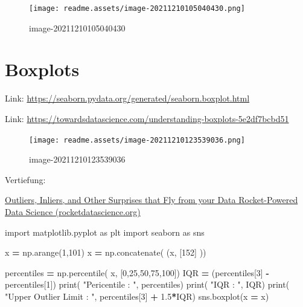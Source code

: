 \documentclass[
  oneside]{book}
\newenvironment{Shaded}{\begin{snugshade}}{\end{snugshade}}
\newcommand{\BuiltInTok}[1]{#1}
\newcommand{\DecValTok}[1]{\textcolor[rgb]{0.00,0.00,0.81}{#1}}
\newcommand{\FloatTok}[1]{\textcolor[rgb]{0.00,0.00,0.81}{#1}}
\newcommand{\ImportTok}[1]{#1}
\newcommand{\NormalTok}[1]{#1}
\newcommand{\OperatorTok}[1]{\textcolor[rgb]{0.81,0.36,0.00}{\textbf{#1}}}
\newcommand{\StringTok}[1]{\textcolor[rgb]{0.31,0.60,0.02}{#1}}
\begin{document}
\begin{figure}
\centering
\texttt{[image: readme.assets/image-20211210105040430.png]}
\caption{image-20211210105040430}
\end{figure}

\hypertarget{boxplots}{%
\section{Boxplots}\label{boxplots}}

Link: \url{https://seaborn.pydata.org/generated/seaborn.boxplot.html} 

Link: \url{https://towardsdatascience.com/understanding-boxplots-5e2df7bcbd51}

\begin{figure}
\centering
\texttt{[image: readme.assets/image-20211210123539036.png]}
\caption{image-20211210123539036}
\end{figure}

Vertiefung:

\href{http://rocketdatascience.org/?p=473}{Outliers, Inliers, and Other Surprises that Fly from your Data \textbar{} Rocket-Powered Data Science (rocketdatascience.org)}

\begin{Shaded}
\begin{Highlighting}[]
\ImportTok{import}\NormalTok{ matplotlib.pyplot }\ImportTok{as}\NormalTok{ plt}
\ImportTok{import}\NormalTok{ seaborn }\ImportTok{as}\NormalTok{ sns}

\NormalTok{x }\OperatorTok{=}\NormalTok{ np.arange(}\DecValTok{1}\NormalTok{,}\DecValTok{101}\NormalTok{)}
\NormalTok{x }\OperatorTok{=}\NormalTok{ np.concatenate( (x, [}\DecValTok{152}\NormalTok{] ))}

\NormalTok{percentiles }\OperatorTok{=}\NormalTok{ np.percentile( x, [}\DecValTok{0}\NormalTok{,}\DecValTok{25}\NormalTok{,}\DecValTok{50}\NormalTok{,}\DecValTok{75}\NormalTok{,}\DecValTok{100}\NormalTok{])}
\NormalTok{IQR }\OperatorTok{=}\NormalTok{ (percentiles[}\DecValTok{3}\NormalTok{] }\OperatorTok{{-}}\NormalTok{  percentiles[}\DecValTok{1}\NormalTok{])}
\BuiltInTok{print}\NormalTok{( }\StringTok{"Pericentile         : "}\NormalTok{, percentiles)}
\BuiltInTok{print}\NormalTok{( }\StringTok{"IQR                 : "}\NormalTok{, IQR)}
\BuiltInTok{print}\NormalTok{( }\StringTok{"Upper Outlier Limit : "}\NormalTok{, percentiles[}\DecValTok{3}\NormalTok{] }\OperatorTok{+} \FloatTok{1.5}\OperatorTok{*}\NormalTok{IQR)}
\NormalTok{sns.boxplot(x }\OperatorTok{=}\NormalTok{ x)}
\end{Highlighting}
\end{Shaded}
\end{document}
